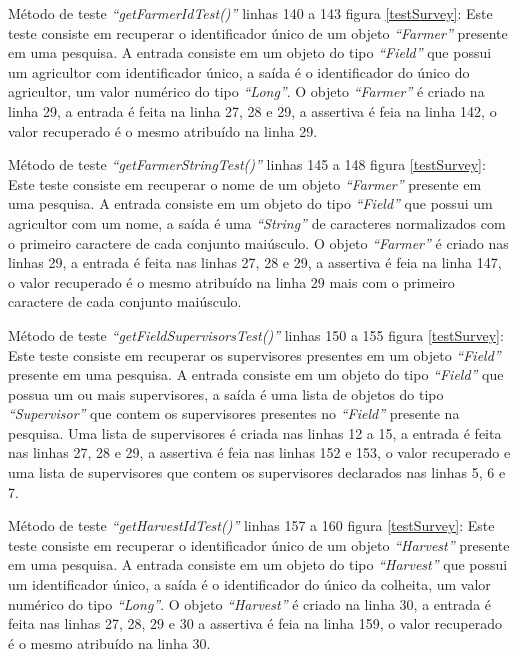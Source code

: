 Método de teste \textit{“getFarmerIdTest()”} linhas 140 a 143 figura \ref{testSurvey}: Este teste consiste em recuperar o identificador único de um objeto \textit{“Farmer”} presente em uma pesquisa. A entrada consiste em um objeto do tipo \textit{“Field”} que possui um agricultor com identificador único, a saída é o identificador do único do agricultor, um valor numérico do tipo \textit{“Long”}. O objeto \textit{“Farmer”} é criado na linha 29, a entrada é feita na linha 27, 28 e 29, a assertiva é feia na linha 142, o valor recuperado é o mesmo atribuído na linha 29.

Método de teste \textit{“getFarmerStringTest()”} linhas 145 a 148 figura \ref{testSurvey}: Este teste consiste em recuperar o nome de um objeto \textit{“Farmer”} presente em uma pesquisa. A entrada consiste em um objeto do tipo \textit{“Field”} que possui um agricultor com um nome, a saída é uma \textit{“String”} de caracteres normalizados com o primeiro caractere de cada conjunto maiúsculo. O objeto \textit{“Farmer”} é criado nas linhas 29, a entrada é feita nas linhas 27, 28 e 29, a assertiva é feia na linha 147, o valor recuperado é o mesmo atribuído na linha 29 mais com o primeiro caractere de cada conjunto maiúsculo.

Método de teste \textit{“getFieldSupervisorsTest()”} linhas 150 a 155 figura \ref{testSurvey}: Este teste consiste em recuperar os supervisores presentes em um objeto \textit{“Field”} presente em uma pesquisa. A entrada consiste em um objeto do tipo \textit{“Field”} que possua um ou mais supervisores, a saída é uma lista de objetos do tipo \textit{“Supervisor”} que contem os supervisores presentes no \textit{“Field”} presente na pesquisa. Uma lista de supervisores é criada nas linhas 12 a 15, a entrada é feita nas linhas 27, 28 e 29, a assertiva é feia nas linhas 152 e 153, o valor recuperado e uma lista de supervisores que contem os supervisores declarados nas linhas 5, 6 e 7.


Método de teste \textit{“getHarvestIdTest()”} linhas 157 a 160 figura \ref{testSurvey}: Este teste consiste em recuperar o identificador único de um objeto \textit{“Harvest”} presente em uma pesquisa. A entrada consiste em um objeto do tipo \textit{“Harvest”} que possui um identificador único, a saída é o identificador do único da colheita, um valor numérico do tipo \textit{“Long”}. O objeto \textit{“Harvest”} é criado na linha 30, a entrada é feita nas linhas 27, 28, 29 e 30 a assertiva é feia na linha 159, o valor recuperado é o mesmo atribuído na linha 30.

